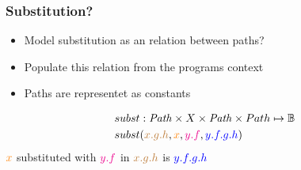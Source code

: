 \documentclass[leqno]{beamer}
\begin{document}
\begin{frame}
\frametitle{Substitution?}
\begin{itemize}
  \item Model substitution as an relation between paths?
  \item Populate this relation from the programs context
  \item Paths are representet as constants
\end{itemize}

\begin{align*}
&subst : \mathit{Path} \times X \times \mathit{Path} \times Path \mapsto \mathbb{B}\\
&subst({\color{brown}x.g.h}, {\color{orange}x}, {\color{magenta}y.f}, {\color{blue}y.f.g.h})
\end{align*}
${\color{orange}x}$ substituted with ${\color{magenta}y.f}$ in ${\color{brown}x.g.h}$ is ${\color{blue}y.f.g.h}$
\end{frame}
\end{document}
